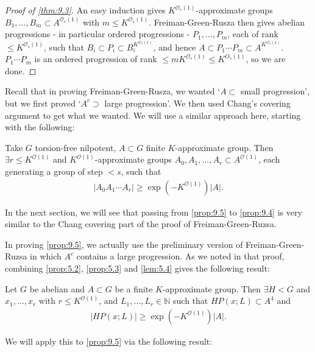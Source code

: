 \documentclass{article}
\newcommand{\bigO}{\mathcal{O}}
\numberwithin{equation}{section}
\begin{document}
\begin{proof}[Proof of \cref{thm:9.3}]
  An easy induction gives $K^{\mathcal{O}_s(1)}$-approximate groups $B_1, \dotsc, B_m \subset A^{\mathcal{O}_s(1)}$ with $m \leq K^{\mathcal{O}_s(1)}$.
  Freiman-Green-Rusza then gives abelian progressions - in particular ordered progressions - $P_1, \dotsc, P_m$, each of rank $\leq K^{\bigO_s(1)}$, such that $B_i \subset P_i \subset B_i^{K^{\bigO_s(1)}}$, and hence $A \subset P_1 \dotsm P_m \subset A^{K^{\bigO_s(1)}}$.
  $P_1 \dotsm P_m$ is an ordered progression of rank $\leq m K^{\bigO_s(1)} \leq K^{O_s(1)}$, so we are done.
\end{proof}
Recall that in proving Freiman-Green-Rusza, we wanted `$A \subset$ small progression', but we first proved `$A^c \supset$ large progression'.
We then used Chang's covering argument to get what we wanted.
We will use a similar approach here, starting with the following:
\begin{nprop}\label{prop:9.5}
  Take $G$ torsion-free nilpotent, $A \subset G$ finite $K$-approximate group.
  Then $\exists r \leq K^{\bigO(1)}$ and $K^{\bigO(1)}$-approximate groups $A_0, A_1, \dotsc, A_r \subset A^{\bigO(1)}$, each generating a group of step $< s$, such that
  \begin{align*}
    |A_0 A_1 \dotsm A_r| \geq \exp(-K^{\bigO(1)})|A|.
  \end{align*}
\end{nprop}
In the next section, we will see that passing from \cref{prop:9.5} to \cref{prop:9.4} is very similar to the Chang covering part of the proof of Freiman-Green-Ruzsa.

In proving \cref{prop:9.5}, we actually use the preliminary version of Freiman-Green-Ruzsa in which $A^c$ contains a large progression.
As we noted in that proof, combining \cref{prop:5.2}, \cref{prop:5.3} and \cref{lem:5.4} gives the following result:

\begin{nthm}\label{thm:9.6}
  Let $G$ be abelian and $A \subset G$ be a finite $K$-approximate group.
  Then $\exists H < G$ and $x_1, \dotsc, x_r$ with $r \leq K^{\bigO(1)}$, and $L_1, \dotsc, L_r \in \mathbb{N}$ such that $HP(x;L) \subset A^4$ and
  \begin{align*}
    |HP(x;L)| \geq \exp(-K^{\bigO(1)})|A|.
  \end{align*}
\end{nthm}
We will apply this to \cref{prop:9.5} via the following result:
\end{document}
